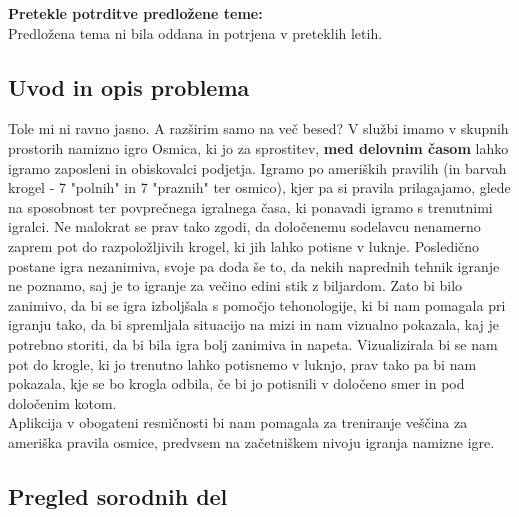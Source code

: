 \documentclass[a4paper, 12pt]{article}
\newcommand\cmnt[1]{\textcolor{munsell}{#1}}
\begin{document}
\newpage

\textbf{Pretekle potrditve predložene teme:}\\
Predložena tema ni bila oddana in potrjena v preteklih letih.

\newpage
\subsection{Uvod in opis problema}
\cmnt{Tole mi ni ravno jasno. A razširim samo na več besed?}
V službi imamo v skupnih prostorih namizno igro Osmica, ki jo za sprostitev, \textbf{med delovnim časom} lahko igramo
zaposleni in obiskovalci podjetja. Igramo po ameriških pravilih (in barvah krogel - 7 "polnih" in 7 "praznih" ter osmico), kjer pa si
pravila prilagajamo, glede na sposobnost ter povprečnega igralnega časa, ki ponavadi igramo s trenutnimi igralci. Ne malokrat se prav tako
zgodi, da določenemu sodelavcu nenamerno zaprem pot do razpoložljivih krogel, ki jih lahko potisne v luknje. Posledično postane igra
nezanimiva, svoje pa doda še to, da nekih naprednih tehnik igranje ne poznamo, saj je to igranje za večino edini stik z biljardom. 
Zato bi bilo zanimivo, da bi se igra izboljšala s pomočjo tehonologije, ki bi nam pomagala pri igranju tako, da bi spremljala situacijo na
mizi in nam vizualno pokazala, kaj je potrebno storiti, da bi bila igra bolj zanimiva in napeta. Vizualizirala bi se nam pot do 
krogle, ki jo trenutno lahko potisnemo v luknjo, prav tako pa bi nam pokazala, kje se bo krogla odbila, 
če bi jo potisnili v določeno smer in pod določenim kotom.  \\
Aplikcija v obogateni resničnosti bi nam pomagala za treniranje veščina za ameriška pravila osmice, predvsem na začetniškem nivoju igranja
namizne igre. 

\subsection{Pregled sorodnih del}
\end{document}
